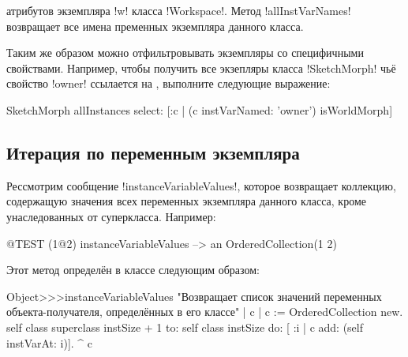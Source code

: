 \documentclass[a4paper,10pt,twoside]{book}
\begin{document}
  атрибутов экземпляра \ct!w! класса \ct!Workspace!.
Метод \ct!allInstVarNames! возвращает все имена пременных экземпляра данного класса.

Таким же образом можно отфильтровывать экземпляры со специфичными свойствами.
Например, чтобы получить все экзепляры класса \ct!SketchMorph! чьё свойство \ct!owner! ссылается на , выполните следующие выражение:
\begin{code}{}
SketchMorph allInstances select: [:c | (c instVarNamed: 'owner') isWorldMorph]
\end{code}

\subsection{Итерация по переменным экземпляра}

Рессмотрим сообщение \ct!instanceVariableValues!, которое возвращает коллекцию, содержащую значения всех переменных экземпляра данного класса, кроме унаследованных от суперкласса.
Например:
\begin{code}{@TEST}
(1@2) instanceVariableValues --> an OrderedCollection(1 2)
\end{code}

Этот метод определён в классе  следующим образом:
\begin{code}{}
Object>>>instanceVariableValues
	"Возвращает список значений переменных объекта-получателя, определённых в его классе"
	| c |
	c := OrderedCollection new.
	self class superclass instSize + 1
		to: self class instSize
		do: [ :i | c add: (self instVarAt: i)].
	^ c
\end{code}
\end{document}
